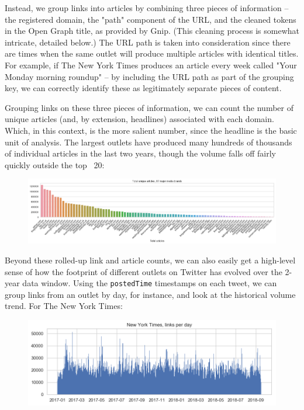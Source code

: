 \documentclass{scrartcl}
\begin{document}
Instead, we group links into articles by combining three pieces of information -- the registered domain, the "path" component of the URL, and the cleaned tokens in the Open Graph title, as provided by Gnip. (This cleaning process is somewhat intricate, detailed below.) The URL path is taken into consideration since there are times when the same outlet will produce multiple articles with identical titles. For example, if The New York Times produces an article every week called "Your Monday morning roundup" -- by including the URL path as part of the grouping key, we can correctly identify these as legitimately separate pieces of content.

Grouping links on these three pieces of information, we can count the number of unique articles (and, by extension, headlines) associated with each domain. Which, in this context, is the more salient number, since the headline is the basic unit of analysis. The largest outlets have produced many hundreds of thousands of individual articles in the last two years, though the volume falls off fairly quickly outside the top ~20:

\begin{figure}[H]
  \centering
  \includegraphics[width=\textwidth]{figures/t87-article-counts.png}
\end{figure}

Beyond these rolled-up link and article counts, we can also easily get a high-level sense of how the footprint of different outlets on Twitter has evolved over the 2-year data window. Using the \texttt{postedTime} timestamps on each tweet, we can group links from an outlet by day, for instance, and look at the historical volume trend. For The New York Times:

\begin{figure}[H]
  \centering
  \includegraphics[width=\textwidth]{figures/nyt-links-per-day.png}
\end{figure}
\end{document}
